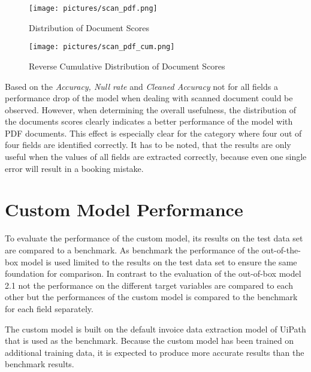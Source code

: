 \begin{figure}[!ht]
    \centering 
    \texttt{[image: pictures/scan\_pdf.png]}
    \caption{Distribution of Document Scores}
    \label{pic:scan_pdf_1}    %
\end{figure}
\begin{figure}[!ht]
    \centering 
    \texttt{[image: pictures/scan\_pdf\_cum.png]}
    \caption{Reverse Cumulative Distribution of Document Scores}
    \label{pic:scan_pdf_1_cum}    %
\end{figure}

Based on the \textit{Accuracy, Null rate} and \textit{Cleaned Accuracy} not for all fields a performance drop of the model when dealing with scanned document could be observed. However, when determining the overall usefulness, the distribution of the documents scores clearly indicates a better performance of the model with PDF documents. This effect is especially clear for the category where four out of four fields are identified correctly. It has to be noted, that the results are only useful when the values of all fields are extracted correctly, because even one single error will result in a booking mistake.

\newpage
\section{Custom Model Performance}
To evaluate the performance of the custom model, its results on the test data set are compared to a benchmark. As benchmark the performance of the out-of-the-box model is used limited to the results on the test data set to ensure the same foundation for comparison. In contrast to the evaluation of the out-of-box model 2.1 not the performance on the different target variables are compared to each other but the performances of the custom model is compared to the benchmark for each field separately.

The custom model is built on the default invoice data extraction model of UiPath that is used as the benchmark. Because the custom model has been trained on additional training data, it is expected to produce more accurate results than the benchmark results.

